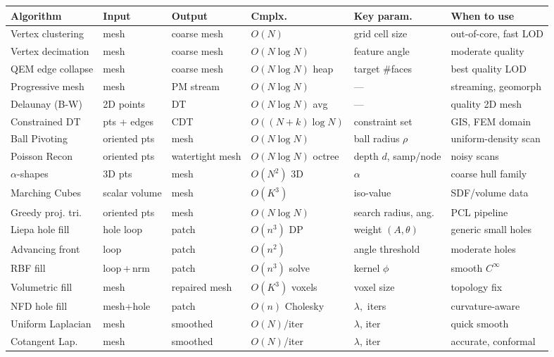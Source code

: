 \begin{paracol}{2}
\scriptsize
\setlength{\tabcolsep}{2pt}
\begin{tabular}{@{}p{2.4cm}p{1.4cm}p{1.5cm}p{1.5cm}p{1.9cm}p{2.2cm}@{}}
\toprule
\textbf{Algorithm} & \textbf{Input} & \textbf{Output} & \textbf{Cmplx.} & \textbf{Key param.} & \textbf{When to use} \\
\midrule
Vertex clustering & mesh & coarse mesh & $O(N)$ & grid cell size & out-of-core, fast LOD \\
Vertex decimation & mesh & coarse mesh & $O(N\log N)$ & feature angle & moderate quality \\
QEM edge collapse & mesh & coarse mesh & $O(N\log N)$ heap & target \#faces & best quality LOD \\
Progressive mesh & mesh & PM stream & $O(N\log N)$ & — & streaming, geomorph \\
Delaunay (B-W) & 2D points & DT & $O(N\log N)$ avg & — & quality 2D mesh \\
Constrained DT & pts + edges & CDT & $O((N+k)\log N)$ & constraint set & GIS, FEM domain \\
Ball Pivoting & oriented pts & mesh & $O(N\log N)$ & ball radius $\rho$ & uniform-density scan \\
Poisson Recon & oriented pts & watertight mesh & $O(N\log N)$ octree & depth $d$, samp/node & noisy scans \\
$\alpha$-shapes & 3D pts & mesh & $O(N^2)$ 3D & $\alpha$ & coarse hull family \\
Marching Cubes & scalar volume & mesh & $O(K^3)$ & iso-value & SDF/volume data \\
Greedy proj. tri. & oriented pts & mesh & $O(N\log N)$ & search radius, ang. & PCL pipeline \\
Liepa hole fill & hole loop & patch & $O(n^3)$ DP & weight $(A,\theta)$ & generic small holes \\
Advancing front & loop & patch & $O(n^2)$ & angle threshold & moderate holes \\
RBF fill & loop\,+\,nrm & patch & $O(n^3)$ solve & kernel $\phi$ & smooth $C^\infty$ \\
Volumetric fill & mesh & repaired mesh & $O(K^3)$ voxels & voxel size & topology fix \\
NFD hole fill & mesh+hole & patch & $O(n)$ Cholesky & $\lambda,$ iters & curvature-aware \\
Uniform Laplacian & mesh & smoothed & $O(N)$/iter & $\lambda$, iter & quick smooth \\
Cotangent Lap. & mesh & smoothed & $O(N)$/iter & $\lambda$, iter & accurate, conformal \\

\end{tabular}
\end{paracol}
